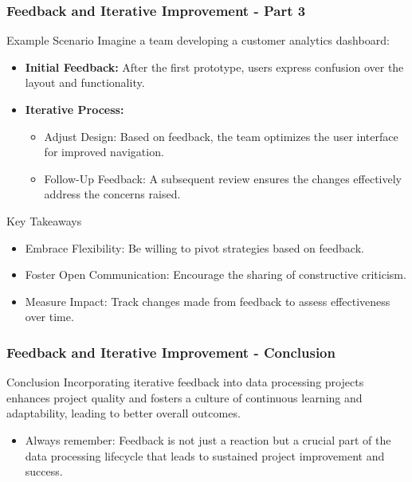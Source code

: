 \documentclass{beamer}
\begin{document}
\begin{frame}[fragile]
    \frametitle{Feedback and Iterative Improvement - Part 3}
    \begin{block}{Example Scenario}
        Imagine a team developing a customer analytics dashboard:
        \begin{itemize}
            \item \textbf{Initial Feedback:} After the first prototype, users express confusion over the layout and functionality.
            \item \textbf{Iterative Process:}
            \begin{itemize}
                \item Adjust Design: Based on feedback, the team optimizes the user interface for improved navigation.
                \item Follow-Up Feedback: A subsequent review ensures the changes effectively address the concerns raised.
            \end{itemize}
        \end{itemize}
    \end{block}

    \begin{block}{Key Takeaways}
        \begin{itemize}
            \item Embrace Flexibility: Be willing to pivot strategies based on feedback.
            \item Foster Open Communication: Encourage the sharing of constructive criticism.
            \item Measure Impact: Track changes made from feedback to assess effectiveness over time.
        \end{itemize}
    \end{block}
\end{frame}

\begin{frame}[fragile]
    \frametitle{Feedback and Iterative Improvement - Conclusion}
    \begin{block}{Conclusion}
        Incorporating iterative feedback into data processing projects enhances project quality and fosters a culture of continuous learning and adaptability, leading to better overall outcomes.
    \end{block}
    
    \begin{itemize}
        \item Always remember: Feedback is not just a reaction but a crucial part of the data processing lifecycle that leads to sustained project improvement and success.
    \end{itemize}
\end{frame}
\end{document}
